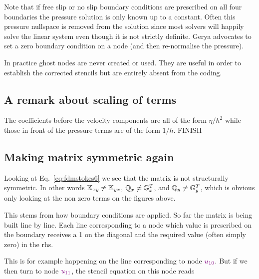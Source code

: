 Note that if free slip or no slip boundary conditions are prescribed on all four boundaries the 
pressure solution is only known up to a constant. Often this pressure nullspace is removed 
from the solution since most solvers will happily solve the linear system even though it is not 
strictly definite. Gerya advocates to set a zero boundary condition on a node (and then re-normalise the 
pressure).

In practice ghost nodes are never created or used. They are useful in order to 
establish the corrected stencils but are entirely absent from the coding.







\subsection{A remark about scaling of terms}

The coefficients before the velocity components are all of the form 
$\eta/h^2$ while those in front of the pressure terms are of the form 
$1/h$. 
FINISH

\subsection{Making matrix symmetric again}

Looking at Eq.~\eqref{eq:fdmstokes6} we see that the matrix is not structurally symmetric. In other words ${\mathbb{K}}_{xy} \neq {\mathbb{K}}_{yx}$, ${\mathbb{Q}}_x \neq {\mathbb{G}}_x^T$, and ${\mathbb{Q}}_y \neq {\mathbb{G}}_y^T$, which is obvious only 
looking at the non zero terms on the figures above. 

This stems from how boundary conditions are applied. So far the matrix is being built line by line.
Each line corresponding to a node which value is prescribed on the boundary receives a 1 on the diagonal and the required value (often simply zero) in the rhs.

This is for example happening on the line corresponding to node ${\color{violet} u_{10}}$. 
But if we then turn to node ${\color{violet} u_{11}}$, the stencil equation on this node 
reads

